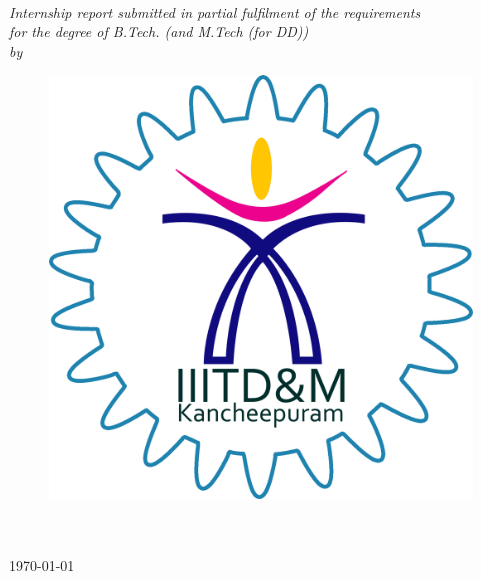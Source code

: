 \documentclass[11pt, a4paper, oneside]{Thesis} %
\begin{document}
\begin{titlepage}
\begin{center}


\vspace{0.4cm} %
{\huge \bfseries \ttitle}\\[0.4cm] %
\vspace{1.5cm} %

 
 \large \textit{Internship report submitted in partial fulfilment of the requirements\\ for the degree of B.Tech. (and M.Tech (for DD))}\\[0.3cm] %
\textit{by}\\[0.4cm]

\authornames

\vfill
\graphicspath{ {./Figures/} }
\begin{figure}[hb]
  \centering
  \includegraphics[width=0.35\linewidth]{iiitdm.png}
\end{figure}

\DEPTNAME\\ %
\textsc{ \UNIVNAME}\\[1.5cm] %
\large \today\\[2cm] %


\end{center}

\end{titlepage}

\end{document}
